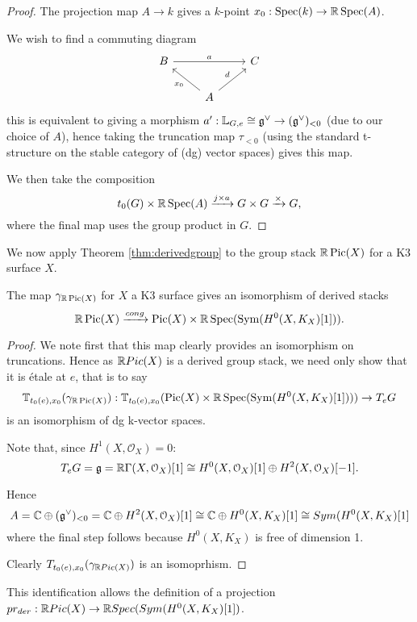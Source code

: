 \begin{proof}
The projection map $A\rightarrow k$ gives a $k$-point $x_{0}:\operatorname{Spec}(k)\rightarrow \mathbb R \operatorname{Spec}(A)$.

We wish to find a commuting diagram 
\[
\begin{tikzcd}
B \arrow{rr}{a} && C\\
 & A \arrow{ur}{d} \arrow{ul}{x_{0}}
\end{tikzcd}
\]
this is equivalent to giving a morphism $a':\mathbb L_{G,e} \cong \mathfrak{g}^{\vee}\rightarrow (\mathfrak{g}^{\vee})_{<0}$ (due to our choice of $A$), hence taking the truncation map $\tau_{< 0}$ (using the standard t-structure on the stable category of (dg) vector spaces) gives 
this map.

We then take the composition
\[t_{0}(G)\times \mathbb R \operatorname{Spec}(A)\xrightarrow{j\times a}G\times G\xrightarrow{\times}G,\]
where the final map uses the group product in $G$.
\end{proof}

We now apply Theorem \ref{thm:derivedgroup} to the group stack $\mathbb R \operatorname{Pic}(X)$ for a K3 surface $X$.

\begin{thm}
The map $\gamma_{\mathbb R \operatorname{Pic}(X)}$ for $X$ a K3 surface gives an isomorphism of derived stacks
\[\mathbb R \operatorname{Pic}(X)\xrightarrow{cong} \operatorname{Pic}(X)\times \mathbb R \operatorname{Spec}(\operatorname{Sym}(H^{0}(X,K_{X})[1])).\]
\end{thm}

\begin{proof}
We note first that this map clearly provides an isomorphism on truncations.  Hence as $\mathbb R Pic(X)$ is a derived group stack, we need only show that it is \'{e}tale at $e$, that is to say 
\[\mathbb T_{t_{0}(e),x_{0}}(\gamma_{\mathbb R \operatorname{Pic}(X)}):\mathbb T_{t_{0}(e),x_{0}}(\operatorname{Pic}(X)\times \mathbb R \operatorname{Spec}(\operatorname{Sym}(H^{0}(X,K_{X})[1])))\rightarrow T_{e}G\]
is an isomorphism of dg k-vector spaces.

Note that, since $H^1(X,\mathcal{O}_X) = 0$: 
\[T_{e}G=\mathfrak{g}=\mathbb R \Gamma(X,\mathcal{O}_{X})[1]\cong H^{0}(X,\mathcal{O}_{X})[1]\oplus H^{2}(X,\mathcal{O}_{X})[-1].\] 

Hence 
\[A=\mathbb C\oplus (\mathfrak{g}^{\vee})_{<0}=\mathbb C\oplus H^{2}(X,\mathcal{O}_{X})[1]\cong \mathbb C \oplus H^{0}(X,K_{X})[1]\cong Sym(H^{0}(X,K_{X})[1]\]
where the final step follows because $H^{0}(X,K_{X})$ is free of dimension 1.

Clearly $T_{t_{0}(e),x_{0}}(\gamma_{\mathbb R Pic(X)})$ is an isomoprhism.
\end{proof}

This identification allows the definition of a projection $pr_{der}:\mathbb R Pic(X)\rightarrow \mathbb R Spec(Sym(H^{0}(X,K_{X})[1])$.

